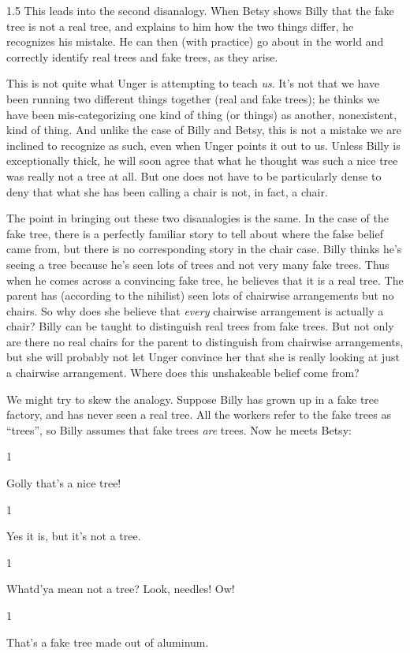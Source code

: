 \documentclass[11pt]{standalone} \newif\ifstandlone \standalonetrue
\newcommand{\stage}[3]%
{%
	\begin{spacing}{1}%
	\vspace{0pt}
		\begin{description}[style=nextline, parsep=0pt,
                    leftmargin=15mm, itemindent=-10mm, font=\mdseries]
			\item[\textsc{#1} \emph{#2}] #3
		\end{description}%
	\end{spacing}%
}
\begin{document}
\begin{spacing}{1.5}
This leads into the second disanalogy.  When Betsy shows Billy that
the fake tree is not a real tree, and explains to him how the two
things differ, he recognizes his mistake.  He can then (with practice)
go about in the world and correctly identify real trees and fake
trees, as they arise.

This is not quite what Unger is attempting to teach {\em us}.  It's
not that we have been running two different things together (real and
fake trees); he thinks we have been mis-categorizing one kind of thing
(or things) as another, nonexistent, kind of thing.  And unlike the
case of Billy and Betsy, this is not a mistake we are inclined to
recognize as such, even when Unger points it out to us.  Unless Billy
is exceptionally thick, he will soon agree that what he thought was
such a nice tree was really not a tree at all.  But one does not have
to be particularly dense to deny that what she has been calling a
chair is not, in fact, a chair.

The point in bringing out these two disanalogies is the same.  In the
case of the fake tree, there is a perfectly familiar story to tell
about where the false belief came from, but there is no corresponding
story in the chair case.  Billy thinks he's seeing a tree because he's
seen lots of trees and not very many fake trees.  Thus when he comes
across a convincing fake tree, he believes that it is a real tree.
The parent has (according to the nihilist) seen lots of chairwise
arrangements but no chairs.  So why does she believe that {\em every}
chairwise arrangement is actually a chair?  Billy can be taught to
distinguish real trees from fake trees.  But not only are there no
real chairs for the parent to distinguish from chairwise arrangements,
but she will probably not let Unger convince her that she is really
looking at just a chairwise arrangement.  Where does this unshakeable
belief come from?

We might try to skew the analogy.  Suppose Billy has grown up in a
fake tree factory, and has never seen a real tree.  All the workers
refer to the fake trees as ``trees'', so Billy assumes that fake trees
{\em are} trees.  Now he meets Betsy:

\stage{Billy}{(pointing)}{Golly that's a nice tree!}

\stage{Betsy}{}{Yes it is, but it's not a tree.}

\stage{Billy}{}{Whatd'ya mean not a tree?  Look, needles!  Ow!}

\stage{Betsy}{}{That's a fake tree made out of aluminum.}


\end{spacing}
\end{document}
